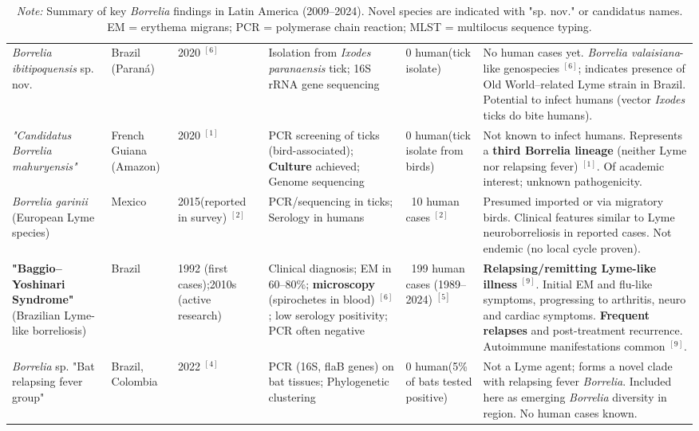 \documentclass[11pt,letterpaper]{article}
\newcommand{\mycite}[1]{$^{[#1]}$}
\begin{document}
\begin{table}[p]
\begin{tabular}{@{}p{2.6cm}p{1.2cm}p{1.2cm}p{2.5cm}p{1.5cm}p{3.7cm}@{}}
\textit{Borrelia ibitipoquensis} sp. nov. & Brazil (Paraná) & 2020 \mycite{6} & Isolation from \textit{Ixodes paranaensis} tick; 16S rRNA gene sequencing & 0 human\newline(tick isolate) & No human cases yet. \textit{Borrelia valaisiana}-like genospecies \mycite{6}; indicates presence of Old World–related Lyme strain in Brazil. Potential to infect humans (vector \textit{Ixodes} ticks do bite humans). \\
\addlinespace[3pt]

\textit{"Candidatus Borrelia mahuryensis"} & French Guiana (Amazon) & 2020 \mycite{1} & PCR screening of ticks (bird-associated); \textbf{Culture} achieved; Genome sequencing & 0 human\newline(tick isolate from birds) & Not known to infect humans. Represents a \textbf{third Borrelia lineage} (neither Lyme nor relapsing fever) \mycite{1}. Of academic interest; unknown pathogenicity. \\
\addlinespace[3pt]

\textit{Borrelia garinii} (European Lyme species) & Mexico & 2015\newline(reported in survey) \mycite{2} & PCR/sequencing in ticks; Serology in humans & ~10 human cases \mycite{2} & Presumed imported or via migratory birds. Clinical features similar to Lyme neuroborreliosis in reported cases. Not endemic (no local cycle proven). \\
\addlinespace[3pt]

\textbf{"Baggio–Yoshinari Syndrome"}\newline(Brazilian Lyme-like borreliosis) & Brazil & 1992 (first cases);\newline2010s (active research) & Clinical diagnosis; EM in 60–80\%; \textbf{microscopy} (spirochetes in blood) \mycite{6}; low serology positivity; PCR often negative & ~199 human cases (1989–2024) \mycite{5} & \textbf{Relapsing/remitting Lyme-like illness} \mycite{9}. Initial EM and flu-like symptoms, progressing to arthritis, neuro and cardiac symptoms. \textbf{Frequent relapses} and post-treatment recurrence. Autoimmune manifestations common \mycite{9}. \\
\addlinespace[3pt]

\textit{Borrelia} sp. "Bat relapsing fever group" & Brazil, Colombia & 2022 \mycite{4} & PCR (16S, flaB genes) on bat tissues; Phylogenetic clustering & 0 human\newline(5\% of bats tested positive) & Not a Lyme agent; forms a novel clade with relapsing fever \textit{Borrelia}. Included here as emerging \textit{Borrelia} diversity in region. No human cases known. \\ 
\bottomrule
\end{tabular}
\caption*{\small\textit{Note:} Summary of key \textit{Borrelia} findings in Latin America (2009–2024). Novel species are indicated with "sp. nov." or candidatus names. EM = erythema migrans; PCR = polymerase chain reaction; MLST = multilocus sequence typing.}
\end{table}
\end{document}
